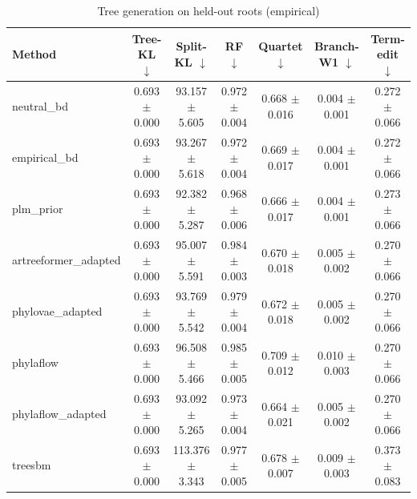 \begin{table}[t]\centering
\caption{Tree generation on held-out roots (empirical)}
\begin{tabular}{lcccccc}
\toprule
Method & Tree-KL $\downarrow$ & Split-KL $\downarrow$ & RF $\downarrow$ & Quartet $\downarrow$ & Branch-W1 $\downarrow$ & Term-edit $\downarrow$ \\
\midrule
neutral\_bd & 0.693 $\pm$ 0.000 & 93.157 $\pm$ 5.605 & 0.972 $\pm$ 0.004 & 0.668 $\pm$ 0.016 & 0.004 $\pm$ 0.001 & 0.272 $\pm$ 0.066 \\
empirical\_bd & 0.693 $\pm$ 0.000 & 93.267 $\pm$ 5.618 & 0.972 $\pm$ 0.004 & 0.669 $\pm$ 0.017 & 0.004 $\pm$ 0.001 & 0.272 $\pm$ 0.066 \\
plm\_prior & 0.693 $\pm$ 0.000 & 92.382 $\pm$ 5.287 & 0.968 $\pm$ 0.006 & 0.666 $\pm$ 0.017 & 0.004 $\pm$ 0.001 & 0.273 $\pm$ 0.066 \\
artreeformer\_adapted & 0.693 $\pm$ 0.000 & 95.007 $\pm$ 5.591 & 0.984 $\pm$ 0.003 & 0.670 $\pm$ 0.018 & 0.005 $\pm$ 0.002 & 0.270 $\pm$ 0.066 \\
phylovae\_adapted & 0.693 $\pm$ 0.000 & 93.769 $\pm$ 5.542 & 0.979 $\pm$ 0.004 & 0.672 $\pm$ 0.018 & 0.005 $\pm$ 0.002 & 0.270 $\pm$ 0.066 \\
phylaflow & 0.693 $\pm$ 0.000 & 96.508 $\pm$ 5.466 & 0.985 $\pm$ 0.005 & 0.709 $\pm$ 0.012 & 0.010 $\pm$ 0.003 & 0.270 $\pm$ 0.066 \\
phylaflow\_adapted & 0.693 $\pm$ 0.000 & 93.092 $\pm$ 5.265 & 0.973 $\pm$ 0.004 & 0.664 $\pm$ 0.021 & 0.005 $\pm$ 0.002 & 0.270 $\pm$ 0.066 \\
treesbm & 0.693 $\pm$ 0.000 & 113.376 $\pm$ 3.343 & 0.977 $\pm$ 0.005 & 0.678 $\pm$ 0.007 & 0.009 $\pm$ 0.003 & 0.373 $\pm$ 0.083 \\
\bottomrule
\end{tabular}
\end{table}